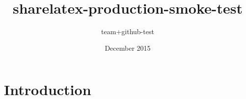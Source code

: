 \documentclass{article}
\title{sharelatex-production-smoke-test}
\author{team+github-test }
\date{December 2015}
\begin{document}
\maketitle

\section{Introduction}
\end{document}

